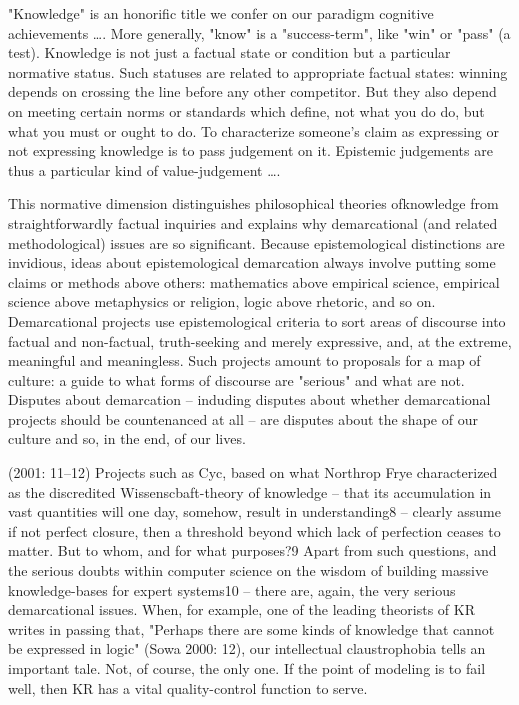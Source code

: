 "Knowledge" is an honorific title we confer on our paradigm cognitive achievements …. More generally, "know" is a "success-term", like "win" or "pass" (a test). Knowledge is not just a factual state or condition but a particular normative status. Such statuses are related to appropriate factual states: winning depends on crossing the line before any other competitor. But they also depend on meeting certain norms or standards which define, not what you do do, but what you must or ought to do. To characterize someone's claim as expressing or not expressing knowledge is to pass judgement on it. Epistemic judgements are thus a particular kind of value-judgement ….

This normative dimension distinguishes philosophical theories ofknowledge from straightforwardly factual inquiries and explains why demarcational (and related methodological) issues are so significant. Because epistemological distinctions are invidious, ideas about epistemological demarcation always involve putting some claims or methods above others: mathematics above empirical science, empirical science above metaphysics or religion, logic above rhetoric, and so on. Demarcational projects use epistemological criteria to sort areas of discourse into factual and non-factual, truth-seeking and merely expressive, and, at the extreme, meaningful and meaningless. Such projects amount to proposals for a map of culture: a guide to what forms of discourse are "serious" and what are not. Disputes about demarcation – induding disputes about whether demarcational projects should be countenanced at all – are disputes about the shape of our culture and so, in the end, of our lives.

(2001: 11–12)
Projects such as Cyc, based on what Northrop Frye characterized as the discredited Wissenscbaft-theory of knowledge – that its accumulation in vast quantities will one day, somehow, result in understanding8 – clearly assume if not perfect closure, then a threshold beyond which lack of perfection ceases to matter. But to whom, and for what purposes?9 Apart from such questions, and the serious doubts within computer science on the wisdom of building massive knowledge-bases for expert systems10 – there are, again, the very serious demarcational issues. When, for example, one of the leading theorists of KR writes in passing that, "Perhaps there are some kinds of knowledge that cannot be expressed in logic" (Sowa 2000: 12), our intellectual claustrophobia tells an important tale. Not, of course, the only one. If the point of modeling is to fail well, then KR has a vital quality-control function to serve.

